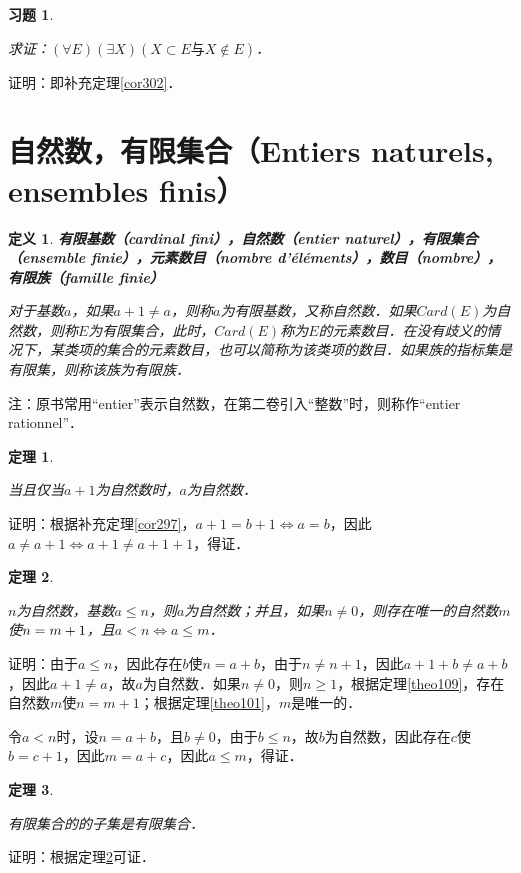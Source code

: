 \documentclass[12pt, a4paper, oneside]{book}
\newtheorem{theo}{定理}
\newtheorem{de}{定义}
\newtheorem{exer}{习题}
\begin{document}
			\begin{exer}\label{exer126}
				\hfill\par
				求证：$(\forall E)(\exists X)(X\subset E\text{与}X \notin E)$．
			\end{exer}
			证明：即补充定理\ref{cor302}．

		\section{自然数，有限集合（Entiers naturels, ensembles finis）}		
			\begin{de}
				\textbf{有限基数（cardinal fini），自然数（entier naturel），有限集合（ensemble finie），元素数目（nombre d'éléments），数目（nombre），有限族（famille finie）
				}
				\par
				对于基数$a$，如果$a+1\neq a$，则称$a$为有限基数，又称自然数．如果$Card(E)$为自然数，则称$E$为有限集合，此时，$Card(E)$称为$E$的元素数目．在没有歧义的情况下，某类项的集合的元素数目，也可以简称为该类项的数目．如果族的指标集是有限集，则称该族为有限族．
			\end{de}
			注：原书常用“entier”表示自然数，在第二卷引入“整数”时，则称作“entier rationnel”．
			
			\begin{theo}\label{theo115}
				\hfill\par
				当且仅当$a+1$为自然数时，$a$为自然数．
			\end{theo}
			证明：根据补充定理\ref{cor297}，$a+1=b+1\Leftrightarrow a=b$，因此$a\neq a+1\Leftrightarrow a+1\neq a+1+1$，得证．
						
			\begin{theo}\label{theo116}
				\hfill\par
				$n$为自然数，基数$a\leq n$，则$a$为自然数；并且，如果$n\neq 0$，则存在唯一的自然数$m$使$n\\=m+1$，且$a<n\Leftrightarrow a\leq m$．
			\end{theo}
			证明：由于$a\leq n$，因此存在$b$使$n=a+b$，由于$n\neq n+1$，因此$a+1+b\neq a+b$，因此$a+1\neq a$，故$a$为自然数．如果$n\neq 0$，则$n\geq 1$，根据定理\ref{theo109}，存在自然数$m$使$n=m+1$；根据定理\ref{theo101}，$m$是唯一的．
			\par
			令$a<n$时，设$n=a+b$，且$b\neq 0$，由于$b\leq n$，故$b$为自然数，因此存在$c$使$b=c+1$，因此$m=a+c$，因此$a\leq m$，得证．
						
			\begin{theo}\label{theo117}
				\hfill\par
				有限集合的的子集是有限集合．
			\end{theo}
			证明：根据定理\ref{theo116}可证．
									
\end{document}
